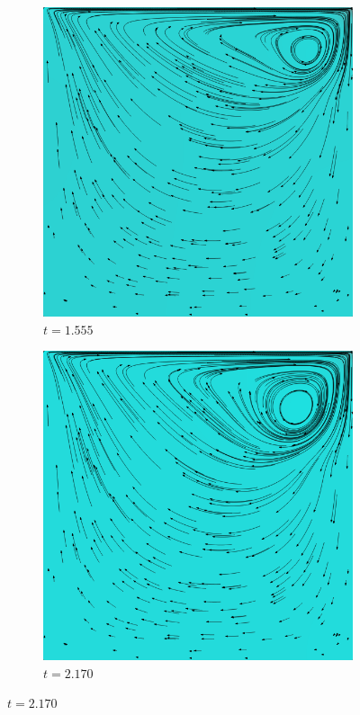 \begin{figure}[!htb]
			\begin{subfigure}[b]{.5\textwidth}
				\includegraphics[scale = 0.28]{screenshots/re-1000-512-01555.png}
				\caption{$t=1.555$}
			\end{subfigure}%
			\begin{subfigure}[b]{.5\textwidth}
				\includegraphics[scale = 0.28]{screenshots/re-1000-512-02170.png}
				\caption{$t=2.170$}
			\end{subfigure}


\end{figure}
